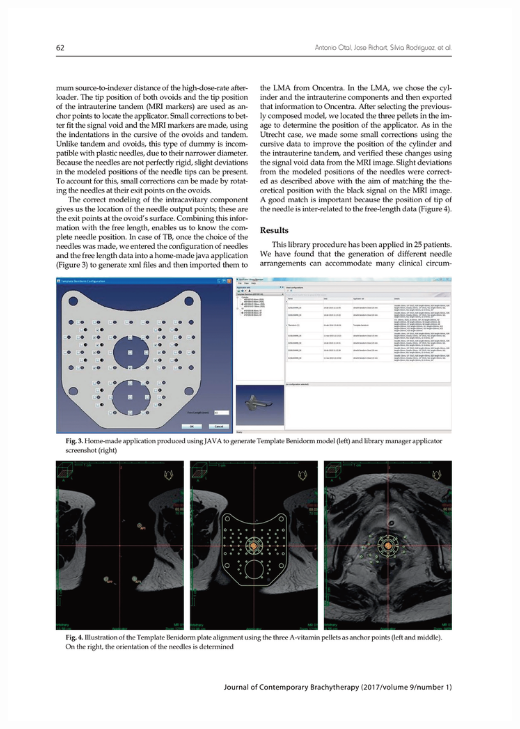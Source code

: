 \documentclass[
  a4paper,
]{scrreprt}
\begin{document}
\includegraphics{articulos/librerias/librerias-4.png}
\end{document}
